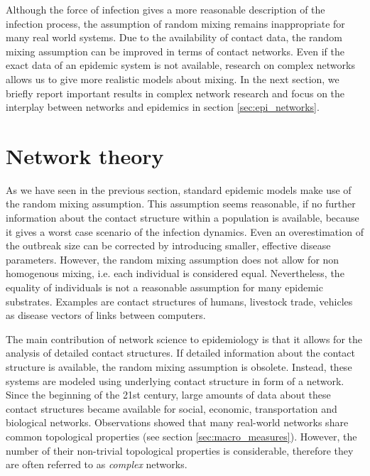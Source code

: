 Although the force of infection gives a more reasonable description of the infection process, the assumption of random mixing remains inappropriate for many real world systems.
Due to the availability of contact data, the random mixing assumption can be improved in terms of contact networks.
Even if the exact data of an epidemic system is not available, research on complex networks allows us to give more realistic models about mixing.
In the next section, we briefly report important results in complex network research and focus on the interplay between networks and epidemics in section \ref{sec:epi_networks}.


\section{Network theory}\label{sec:network_theory}
As we have seen in the previous section, standard epidemic models make use of the random mixing assumption.
This assumption seems reasonable, if no further information about the contact structure within a population is available, because it gives a worst case scenario of the infection dynamics.
Even an overestimation of the outbreak size can be corrected by introducing smaller, effective disease parameters.
However, the random mixing assumption does not allow for non homogenous mixing, i.e. each individual is considered equal.
Nevertheless, the equality of individuals is not a reasonable assumption for many epidemic substrates.
Examples are contact structures of humans, livestock trade, vehicles as disease vectors of links between computers.

The main contribution of network science to epidemiology is that it allows for the analysis of detailed contact structures.
If detailed information about the contact structure is available, the random mixing assumption is obsolete.
Instead, these systems are modeled using underlying contact structure in form of a network.
Since the beginning of the 21st century, large amounts of data about these contact structures became available for social, economic, transportation and biological networks.
Observations showed that many real-world networks share common topological properties (see section \ref{sec:macro_measures}).
However, the number of their non-trivial topological properties is considerable, therefore they are often referred to as \emph{complex} networks.

